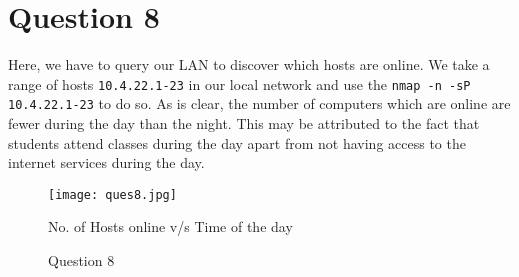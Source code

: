 \documentclass{article}
\begin{document}
\section*{Question 8}

Here, we have to query our LAN to discover which hosts are online. We take a range of hosts \texttt{10.4.22.1-23} in our local network and use the \texttt{nmap -n -sP 10.4.22.1-23} to do so. As is clear, the number of computers which are online are fewer during the day than the night. This may be attributed to the fact that students attend classes during the day apart from not having access to the internet services during the day.

	\begin{figure}[h!]

	\begin{center}

	\texttt{[image: ques8.jpg]}
	\caption{Question 8}
	{\footnotesize No. of Hosts online v/s Time of the day \par}

	\end{center}

	\end{figure}
\end{document}
